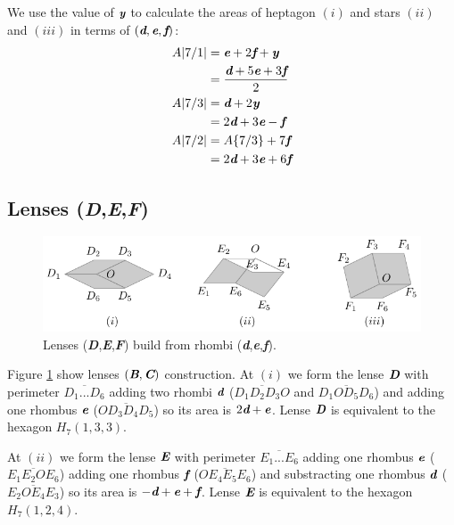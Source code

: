 \documentclass[11pt]{article}
\def\mathbi#1{\textbf{\em #1}}
\begin{document}
We use the value of $\mathbi{y}$ to calculate the areas of heptagon $(i)$ and stars $(ii)$ and $(iii)$ in terms of $(\mathbi{d},\mathbi{e},\mathbi{f})$:
\begin{align}
A|7/1| &= \mathbi{e} + 2\mathbi{f} + \mathbi{y} \nonumber\\
    &= \frac{\mathbi{d} + 5\mathbi{e} + 3\mathbi{f}}2 \\
A|7/3| &= \mathbi{d} + 2\mathbi{y} \nonumber\\
 &= 2\mathbi{d} + 3\mathbi{e} - \mathbi{f} \\
A|7/2| &= A\{7/3\} + 7\mathbi{f} \nonumber\\
 &= 2\mathbi{d} + 3\mathbi{e} + 6\mathbi{f}
\end{align}

\subsection{Lenses (\mathbi{D},\mathbi{E},\mathbi{F})}

\begin{figure}[H]
\centering
\includegraphics[scale=1.1]{def/def}
\caption{Lenses (\mathbi{D},\mathbi{E},\mathbi{F}) build from rhombi (\mathbi{d},\mathbi{e},\mathbi{f}).}
\label{fig:def-hexagons}
\end{figure}



Figure \ref{fig:def-hexagons} show lenses $(\mathbi{B},\mathbi{C})$ construction.
At $(i)$ we form the lense $\mathbi{D}$ with perimeter $\overline{D_1...D_6}$ adding two rhombi $\mathbi{d}$ ($\overline{D_1D_2D_3O}$ and $\overline{D_1OD_5D_6}$) and adding one rhombus $\mathbi{e}$ ($\overline{OD_3D_4D_5}$) so its area is $2\mathbi{d} + \mathbi{e}$. Lense $\mathbi{D}$ is equivalent to the hexagon $H_7(1,3,3)$.

At $(ii)$ we form the lense $\mathbi{E}$ with perimeter $\overline{E_1...E_6}$ adding one rhombus $\mathbi{e}$ ($\overline{E_1E_2OE_6}$) adding one rhombus $\mathbi{f}$ ($\overline{OE_4E_5E_6}$) and substracting one rhombus $\mathbi{d}$ ($\overline{E_2OE_4E_3}$) so its area is $-\mathbi{d} + \mathbi{e} + \mathbi{f}$. Lense $\mathbi{E}$ is equivalent to the hexagon $H_7(1,2,4)$.
\end{document}
